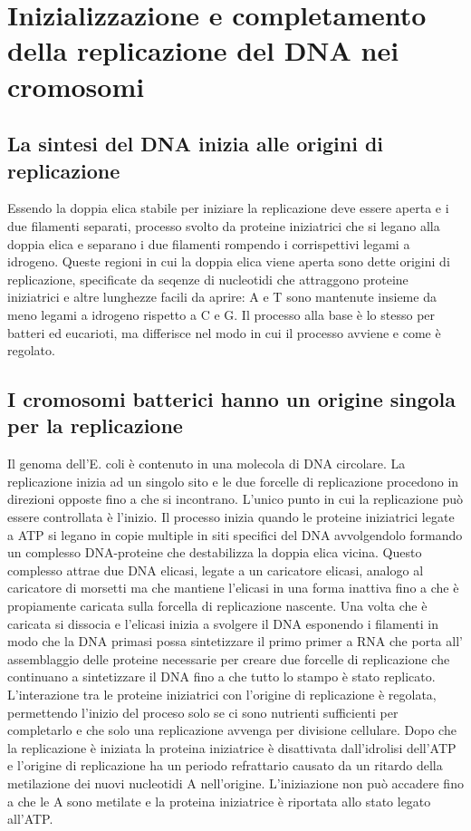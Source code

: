 \section{Inizializzazione e completamento della replicazione del DNA nei cromosomi}
\subsection{La sintesi del DNA inizia alle origini di replicazione}
Essendo la doppia elica stabile per iniziare la replicazione deve essere aperta e i due filamenti separati, processo svolto da proteine iniziatrici che si legano alla doppia elica e 
separano i due filamenti rompendo i corrispettivi legami a idrogeno. Queste regioni in cui la doppia elica viene aperta sono dette origini di replicazione, specificate da seqenze di 
nucleotidi che attraggono proteine iniziatrici e altre lunghezze facili da aprire: A e T sono mantenute insieme da meno legami a idrogeno rispetto a C e G. Il processo alla base \`e lo
stesso per batteri ed eucarioti, ma differisce nel modo in cui il processo avviene e come \`e regolato. 
\subsection{I cromosomi batterici hanno un origine singola per la replicazione}
Il genoma dell'E. coli \`e contenuto in una molecola di DNA circolare. La replicazione inizia ad un singolo sito e le due forcelle di replicazione procedono in direzioni opposte fino
a che si incontrano. L'unico punto in cui la replicazione pu\`o essere controllata \`e l'inizio. Il processo inizia quando le proteine iniziatrici legate a ATP si legano in copie 
multiple in siti specifici del DNA avvolgendolo formando un complesso DNA-proteine che destabilizza la doppia elica vicina. Questo complesso attrae due DNA elicasi, legate a un 
caricatore elicasi, analogo al caricatore di morsetti ma che mantiene l'elicasi in una forma inattiva fino a che \`e propiamente caricata sulla forcella di replicazione nascente. Una
volta che \`e caricata si dissocia e l'elicasi inizia a svolgere il DNA esponendo i filamenti in modo che la DNA primasi possa sintetizzare il primo primer a RNA che porta all'
assemblaggio delle proteine necessarie per creare due forcelle di replicazione che continuano a sintetizzare il DNA fino a che tutto lo stampo \`e stato replicato. L'interazione tra le
proteine iniziatrici con l'origine di replicazione \`e regolata, permettendo l'inizio del proceso solo se ci sono nutrienti sufficienti per completarlo e che solo una replicazione 
avvenga per divisione cellulare. Dopo che la replicazione \`e iniziata la proteina iniziatrice \`e disattivata dall'idrolisi dell'ATP e l'origine di replicazione ha un periodo 
refrattario causato da un ritardo della metilazione dei nuovi nucleotidi A nell'origine. L'iniziazione non pu\`o accadere fino a che le A sono metilate e la proteina iniziatrice \`e 
riportata allo stato legato all'ATP. 
